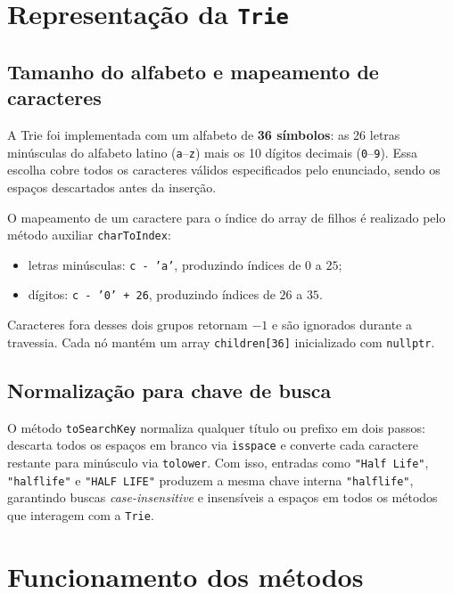 \documentclass[11pt,a4paper]{article}
\begin{document}
\section*{Representação da \texttt{Trie}}
 
\subsection*{Tamanho do alfabeto e mapeamento de caracteres}
 
A Trie foi implementada com um alfabeto de \textbf{36 símbolos}: as 26 letras minúsculas do alfabeto latino (\texttt{a}--\texttt{z}) mais os 10 dígitos decimais (\texttt{0}--\texttt{9}). Essa escolha cobre todos os caracteres válidos especificados pelo enunciado, sendo os espaços descartados antes da inserção.
 
O mapeamento de um caractere para o índice do array de filhos é realizado pelo método auxiliar \texttt{charToIndex}:
 
\begin{itemize}
  \item letras minúsculas: \texttt{c - 'a'}, produzindo índices de $0$ a $25$;
  \item dígitos: \texttt{c - '0' + 26}, produzindo índices de $26$ a $35$.
\end{itemize}
 
Caracteres fora desses dois grupos retornam $-1$ e são ignorados durante a travessia. Cada nó mantém um array \texttt{children[36]} inicializado com \texttt{nullptr}.
 
\subsection*{Normalização para chave de busca}
 
O método \texttt{toSearchKey} normaliza qualquer título ou prefixo em dois passos: descarta todos os espaços em branco via \texttt{isspace} e converte cada caractere restante para minúsculo via \texttt{tolower}. Com isso, entradas como \texttt{"Half Life"}, \texttt{"halflife"} e \texttt{"HALF LIFE"} produzem a mesma chave interna \texttt{"halflife"}, garantindo buscas \textit{case-insensitive} e insensíveis a espaços em todos os métodos que interagem com a \texttt{Trie}.
 
\section*{Funcionamento dos métodos}
 
\end{document}
